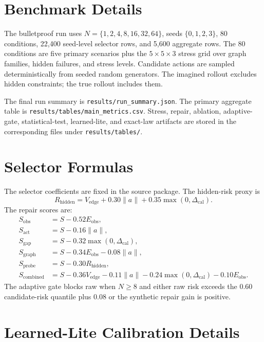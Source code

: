 \documentclass{article}
\newcommand{\score}{S}
\begin{document}
\section{Benchmark Details}

The bulletproof run uses $N=\{1,2,4,8,16,32,64\}$, seeds $\{0,1,2,3\}$, 80 conditions, 22,400 seed-level selector rows, and 5,600 aggregate rows.  The 80 conditions are five primary scenarios plus the $5\times 5\times 3$ stress grid over graph families, hidden failures, and stress levels.  Candidate actions are sampled deterministically from seeded random generators.  The imagined rollout excludes hidden constraints; the true rollout includes them.

The final run summary is \texttt{results/run\_summary.json}.  The primary aggregate table is \texttt{results/tables/main\_metrics.csv}.  Stress, repair, ablation, adaptive-gate, statistical-test, learned-lite, and exact-law artifacts are stored in the corresponding files under \texttt{results/tables/}.

\section{Selector Formulas}

The selector coefficients are fixed in the source package.  The hidden-risk proxy is
\[
R_{\mathrm{hidden}} =
V_{\mathrm{edge}} + 0.30\|a\| + 0.35\max(0,\Delta_{\mathrm{cal}}).
\]
The repair scores are:
\[
\begin{aligned}
\score_{\mathrm{obs}} &= \score -0.52E_{\mathrm{obs}},\\
\score_{\mathrm{act}} &= \score -0.16\|a\|,\\
\score_{\mathrm{gap}} &= \score -0.32\max(0,\Delta_{\mathrm{cal}}),\\
\score_{\mathrm{graph}} &= \score -0.34E_{\mathrm{obs}} -0.08\|a\|,\\
\score_{\mathrm{probe}} &= \score -0.30R_{\mathrm{hidden}},\\
\score_{\mathrm{combined}} &= \score -0.36V_{\mathrm{edge}} -0.11\|a\| -0.24\max(0,\Delta_{\mathrm{cal}}) -0.10E_{\mathrm{obs}}.
\end{aligned}
\]
The adaptive gate blocks raw when $N\geq 8$ and either raw risk exceeds the 0.60 candidate-risk quantile plus 0.08 or the synthetic repair gain is positive.

\section{Learned-Lite Calibration Details}
\end{document}
